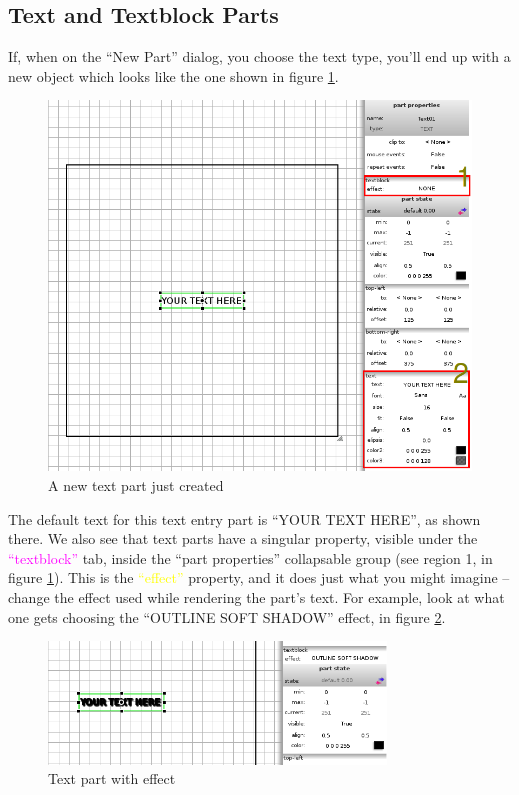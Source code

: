 \documentclass[a4paper]{profusion}
\newcommand{\GUILabel}[1]{\textcolor{magenta}{#1}}
\newcommand{\GUIEditable}[1]{\textcolor{yellow}{#1}} %
\begin{document}
\subsection{Text and Textblock Parts}

If, when on the ``New Part'' dialog, you choose the text type, you'll
end up with a new object which looks like the one shown in figure
\ref{fig:new_text}.

\begin{figure}[h!]
  \centering
  \includegraphics[width=1.0\textwidth]{images/new_text.png}
  \caption{A new text part just created}
  \label{fig:new_text}
\end{figure}

The default text for this text entry part is ``YOUR TEXT HERE'', as
shown there. We also see that text parts have a singular property,
visible under the \GUILabel{``textblock''} tab, inside the ``part
properties'' collapsable group (see region 1, in figure
\ref{fig:new_text}).  This is the \GUIEditable{``effect''} property,
and it does just what you might imagine -- change the effect used
while rendering the part's text. For example, look at what one gets
choosing the ``OUTLINE SOFT SHADOW'' effect, in figure
\ref{fig:text_effect}.

\begin{figure}[h!]
  \centering
  \includegraphics[width=0.8\textwidth]{images/text_effect.png}
  \caption{Text part with effect}
  \label{fig:text_effect}
\end{figure}
\end{document}
